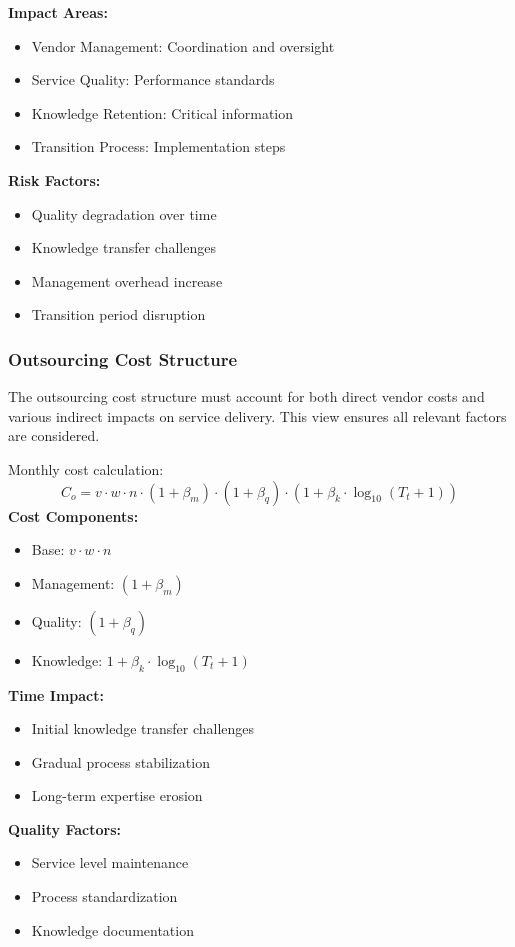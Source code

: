 \documentclass[12pt,a4paper]{article}
\newenvironment{definition}[1]
{\begin{mdframed}[style=definitionstyle,frametitle={Definition: #1}]}
{\end{mdframed}}
\newenvironment{explanation}
{\begin{mdframed}[style=explanationstyle,frametitle={Explanation}]}
{\end{mdframed}}
\newenvironment{observation}
{\begin{mdframed}[style=observationstyle,frametitle={Observation}]}
{\end{mdframed}}
\begin{document}
\begin{explanation}
\textbf{Impact Areas:}
\begin{itemize}
    \item Vendor Management: Coordination and oversight
    \item Service Quality: Performance standards
    \item Knowledge Retention: Critical information
    \item Transition Process: Implementation steps
\end{itemize}
\textbf{Risk Factors:}
\begin{itemize}
    \item Quality degradation over time
    \item Knowledge transfer challenges
    \item Management overhead increase
    \item Transition period disruption
\end{itemize}
\end{explanation}

\subsubsection{Outsourcing Cost Structure}
The outsourcing cost structure must account for both direct vendor costs and various indirect impacts on service delivery. This view ensures all relevant factors are considered.

\begin{definition}{Outsourcing Cost}
Monthly cost calculation:
\begin{equation}
    C_o = v \cdot w \cdot n \cdot (1 + \beta_m) \cdot (1 + \beta_q) \cdot (1 + \beta_k \cdot \log_{10}(T_t + 1))
\end{equation}
\textbf{Cost Components:}
\begin{itemize}
    \item Base: $v \cdot w \cdot n$
    \item Management: $(1 + \beta_m)$
    \item Quality: $(1 + \beta_q)$
    \item Knowledge: $1 + \beta_k \cdot \log_{10}(T_t + 1)$
\end{itemize}
\end{definition}

\begin{observation}
\textbf{Time Impact:}
\begin{itemize}
    \item Initial knowledge transfer challenges
    \item Gradual process stabilization
    \item Long-term expertise erosion
\end{itemize}
\textbf{Quality Factors:}
\begin{itemize}
    \item Service level maintenance
    \item Process standardization
    \item Knowledge documentation
\end{itemize}
\end{observation}
\end{document}
